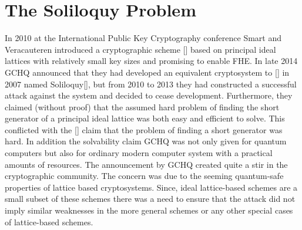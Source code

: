 \section{The Soliloquy Problem}

In 2010 at the International Public Key Cryptography conference Smart
and Veracauteren introduced a cryptographic scheme [\cite{sma20101}] based on
principal ideal lattices with relatively small key sizes and promising
to enable FHE.
\smallskip
In late 2014 GCHQ announced that they had developed an equivalent
cryptosystem to [\cite{sma20101}] in 2007 named Soliloquy[\cite{cam20140}], but from 2010 to
2013 they had constructed a successful attack against the system and
decided to cease development.
\smallskip
Furthermore, they claimed (without proof) that the assumed hard
problem of finding the short generator of a principal ideal lattice was
both easy and efficient to solve. This conflicted with the [\cite{sma20101}]
claim that the problem of finding a short generator was hard. In
addition the solvability claim GCHQ was not only given for quantum
computers but also for ordinary modern computer system with a practical
amounts of resources.
\smallskip
The announcement by GCHQ created quite a stir in the cryptographic
community. The concern was due to the seeming quantum-safe properties
of lattice based cryptosystems. Since, ideal lattice-based schemes are
a small subset of these schemes there was a need to ensure that the
attack did not imply similar weaknesses in the more general schemes or
any other special cases of lattice-based schemes.